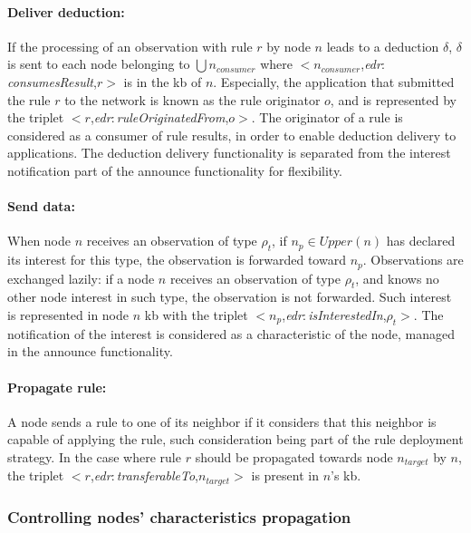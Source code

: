 \documentclass{iosart2c}
\newcommand{\namespace}[1]{\textit{#1$:$}}
\newcommand{\concept}[2]{\namespace{#1}\-\textit{#2}}
\newcommand{\triplet}[3]{$<$#1,\textit{#2},#3$>$}
\begin{document}
\paragraph{Deliver deduction:}
\label{par:deduction_delivery}
If the processing of an observation with rule $r$ by node $n$ leads to a deduction $\delta$, $\delta$ is sent to each node belonging to $\bigcup n_{consumer}$ where \triplet{$n_{consumer}$}{\concept{edr}{consumes\-Result}}{$r$} is in the \gls{kb} of $n$.
Especially, the application that submitted the rule $r$ to the network is known as the rule originator $o$, and is represented by the triplet \triplet{$r$}{\concept{edr}{rule\-Originated\-From}}{$o$}.
The originator of a rule is considered as a consumer of rule results, in order to enable deduction delivery to applications.
The deduction delivery functionality is separated from the interest notification part of the announce functionality for flexibility.

\paragraph{Send data:}
\label{par:data_transfer}
When node $n$ receives an observation of type $\rho_t$, if $n_p \in Upper(n)$ has declared its interest for this type, the observation is forwarded toward $n_{p}$.
Observations are exchanged lazily: if a node $n$ receives an observation of type $\rho_t$, and knows no other node interest in such type, the observation is not forwarded.
Such interest is represented in node $n$ \gls{kb} with the triplet \triplet{$n_{p}$}{\concept{edr}{is\-Interested\-In}}{$\rho_t$}.
The notification of the interest is considered as a characteristic of the node, managed in the announce functionality.

\paragraph{Propagate rule:}
\label{par:send_rule}
A node sends a rule to one of its neighbor if it considers that this neighbor is capable of applying the rule, such consideration being part of the rule deployment strategy. 
In the case where rule $r$ should be propagated towards node $n_{target}$ by $n$, the triplet \triplet{$r$}{\concept{edr}{transferable\-To}}{$n_{target}$} is present in $n$'s \gls{kb}.

\subsubsection{Controlling nodes' characteristics propagation}
\label{subsubs:annouce}
\end{document}
